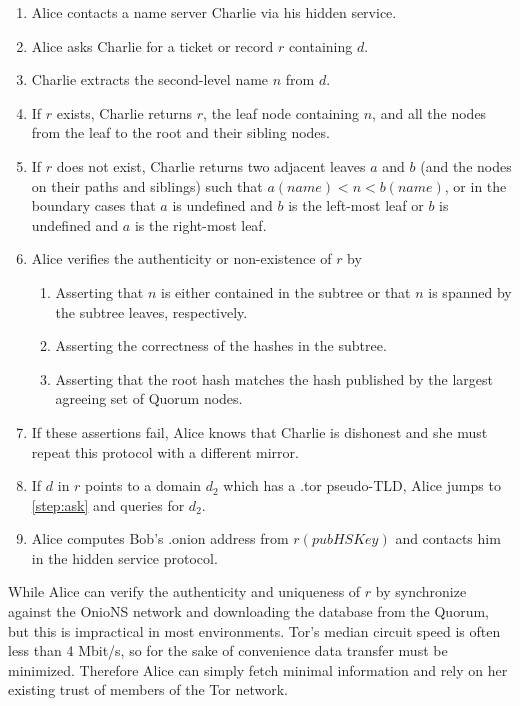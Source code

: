\documentclass[USenglish,oneside,twocolumn]{article}
\begin{document}
\begin{enumerate}
	\item Alice contacts a name server Charlie via his hidden service.
	\item \label{step:ask} Alice asks Charlie for a ticket or record $ r $ containing $ d $.
	\item Charlie extracts the second-level name $ n $ from $ d $.
	\item If $ r $ exists, Charlie returns $ r $, the leaf node containing $ n $, and all the nodes from the leaf to the root and their sibling nodes.
	\item If $ r $ does not exist, Charlie returns two adjacent leaves $ a $ and $ b $ (and the nodes on their paths and siblings) such that $ a(\mathit{name}) < n < b(\mathit{name}) $, or in the boundary cases that $ a $ is undefined and $ b $ is the left-most leaf or $ b $ is undefined and $ a $ is the right-most leaf.
	\item Alice verifies the authenticity or non-existence of $ r $ by 
		\begin{enumerate}
			\item Asserting that $ n $ is either contained in the subtree or that $ n $ is spanned by the subtree leaves, respectively.
			\item Asserting the correctness of the hashes in the subtree.
			\item Asserting that the root hash matches the hash published by the largest agreeing set of Quorum nodes. %
		\end{enumerate}
	\item If these assertions fail, Alice knows that Charlie is dishonest and she must repeat this protocol with a different mirror.
	\item If $ d $ in $ r $ points to a domain $ d_{2} $ which has a .tor pseudo-TLD, Alice jumps to \ref{step:ask} and queries for $ d_{2} $.
	\item Alice computes Bob's .onion address from $ r(\mathit{pubHSKey}) $ and contacts him in the hidden service protocol.
\end{enumerate}

While Alice can verify the authenticity and uniqueness of $ r $ by synchronize against the OnioNS network and downloading the database from the Quorum, but this is impractical in most environments. Tor's median circuit speed is often less than 4 Mbit/s, \cite{TorMetrics} so for the sake of convenience data transfer must be minimized. Therefore Alice can simply fetch minimal information and rely on her existing trust of members of the Tor network.
\end{document}
